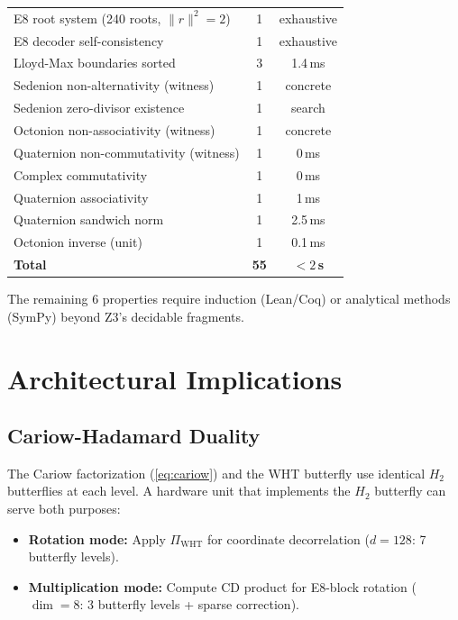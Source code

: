 \documentclass[sigconf,anonymous,review]{acmart}
\newcommand{\norm}[1]{\lVert #1 \rVert}
\begin{document}
\begin{table}[t]
\begin{tabular}{lcc}
E8 root system (240 roots, $\norm{r}^2{=}2$) & 1 & exhaustive \\
E8 decoder self-consistency & 1 & exhaustive \\
Lloyd-Max boundaries sorted & 3 & 1.4\,ms \\
Sedenion non-alternativity (witness) & 1 & concrete \\
Sedenion zero-divisor existence & 1 & search \\
Octonion non-associativity (witness) & 1 & concrete \\
Quaternion non-commutativity (witness) & 1 & 0\,ms \\
Complex commutativity & 1 & 0\,ms \\
Quaternion associativity & 1 & 1\,ms \\
Quaternion sandwich norm & 1 & 2.5\,ms \\
Octonion inverse (unit) & 1 & 0.1\,ms \\
\midrule
\textbf{Total} & \textbf{55} & \textbf{${<}2$\,s} \\
\bottomrule
\end{tabular}
\end{table}

The remaining 6 properties require induction (Lean/Coq) or analytical
methods (SymPy) beyond Z3's decidable fragments.

\section{Architectural Implications}
\label{sec:hardware}

\subsection{Cariow-Hadamard Duality}

The Cariow factorization (\ref{eq:cariow}) and the WHT butterfly
use identical $H_2$ butterflies at each level. A hardware unit that
implements the $H_2$ butterfly can serve both purposes:
\begin{itemize}[nosep,leftmargin=*]
  \item \textbf{Rotation mode:} Apply $\Pi_{\mathrm{WHT}}$ for
        coordinate decorrelation ($d=128$: 7 butterfly levels).
  \item \textbf{Multiplication mode:} Compute CD product for
        E8-block rotation ($\dim=8$: 3 butterfly levels + sparse
        correction).
\end{itemize}
\end{document}
